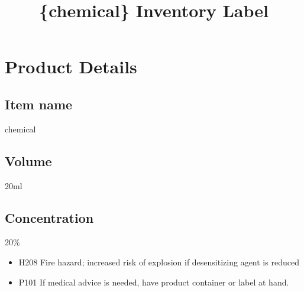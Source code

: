 \documentclass{article}%
\title{\{chemical\} Inventory Label}%
\begin{document}
%
\normalsize%
\pagestyle{header}%
\section*{Product Details}%
\label{sec:ProductDetails}%
\subsection*{\textbf{Item name}}%
\label{subsec:textbfItemname}%
chemical

%
\subsection*{\textbf{Volume}}%
\label{subsec:textbfVolume}%
20ml

%
\subsection*{\textbf{Concentration}}%
\label{subsec:textbfConcentration}%
20\%

%
\begin{mytextbox}%
\begin{itemize}%
\item H208 Fire hazard; increased risk of explosion if desensitizing agent is reduced\par%
\item P101 If medical advice is needed, have product container or label at hand.\par%
\end{itemize}%
\end{mytextbox}%
\end{document}
